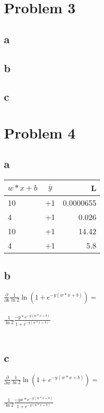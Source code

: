 \documentclass{article}
\begin{document}
\section*{Problem 3}
\subsection*{a}
\subsection*{b}
\subsection*{c}
\section*{Problem 4}
\subsection*{a}
\begin{tabular}{| l | c | r |}
 \hline      
 $w*x + b$ & $\bar{y}$ & L \\ \hline
  10 & +1 & 0.0000655 \\ \hline      
  4 & +1 & 0.026 \\ \hline      
  10 & +1 & 14.42 \\ \hline  
   4 & +1 & 5.8 \\ \hline            
\end{tabular}
\subsection*{b}
$ \frac{\partial }{\partial b} \frac{1}{\ln 2}\ln(1 + e^{-y(w*x + b)}) = $\\\\
$ \frac{1}{\ln 2} \frac{-y*e^{-y(w*x +b)}}{1 + e^{-y(w*x+b)}}$\\\\
\subsection*{c}
$ \frac{\partial }{\partial w} \frac{1}{\ln 2}\ln(1 + e^{-y(w*x + b)}) = $\\\\
$ \frac{1}{\ln 2} \frac{-yx*e^{-y(w*x +b)}}{1 + e^{-y(w*x+b)}}$\\\\
\end{document}
